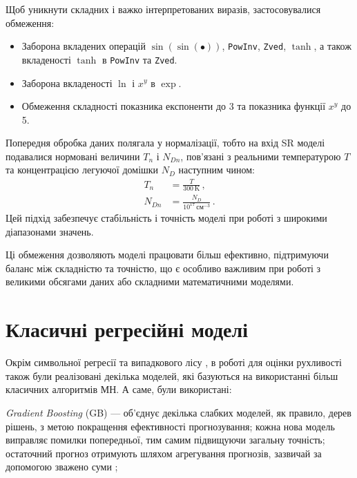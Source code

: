 \documentclass[14pt,a4paper,titlepage,oneside]{book}
\numberwithin{equation}{part}
\begin{document}
Щоб уникнути складних і важко інтерпретованих виразів, застосовувалися обмеження:
\begin{itemize}
  \item Заборона вкладених операцій $\sin(\sin(\bullet))$, \texttt{PowInv}, \texttt{Zved}, $\tanh$, а також вкладеності $\tanh$ в \texttt{PowInv} та \texttt{Zved}.
  \item Заборона вкладеності $\ln$ і $x^y$ в $\exp$.
  \item Обмеження складності показника експоненти до 3 та показника функції $x^y$ до 5.
\end{itemize}

Попередня обробка даних полягала у нормалізації, тобто на вхід SR моделі подавалися нормовані величини $T_n$ і $N_{Dn}$, пов'язані з реальними температурою $T$ та концентрацією легуючої домішки $N_D$ наступним чином:
\begin{subequations} \label{eqNorm}
  \begin{align}
  T_n& = \frac{T}{300\,\text{K}}\,, \label{eqNorma} \\
  N_{Dn}& = \frac{N_D}{10^{17}\,\text{см}^{-3}}\,. \label{eqNormb}
  \end{align}
\end{subequations}
Цей підхід забезпечує стабільність і точність моделі при роботі з широкими діапазонами значень.



Ці обмеження дозволяють моделі працювати більш ефективно, підтримуючи баланс між складністю та точністю, що є особливо важливим при роботі з великими обсягами даних або складними математичними моделями.

\section{Класичні регресійні моделі}\label{secDNN}

Окрім символьної регресії та випадкового лісу , в роботі для оцінки рухливості також були реалізовані декілька моделей, які базуються на використанні
більш класичних алгоритмів МН. А саме, були використані:

\noindent

\noindent
\emph{Gradient Boosting} (GB) ---  об'єднує декілька слабких моделей, як правило, дерев рішень, з метою
покращення ефективності прогнозування;
кожна нова модель виправляє помилки попередньої, тим самим підвищуючи загальну точність;
остаточний прогноз отримують шляхом агрегування прогнозів, зазвичай за допомогою зважено суми \cite{Natekin2013};
\end{document}
